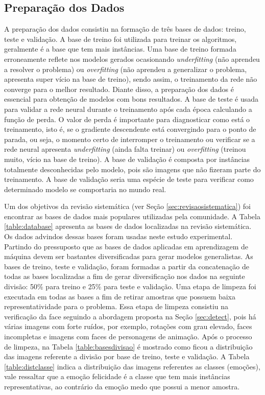 \subsection{Preparação dos Dados}\label{prepdados}
A preparação dos dados consistiu na formação de três bases de dados: treino, teste e validação. A base de treino foi utilizada para treinar os algoritmos, geralmente é a base que tem mais instâncias. Uma base de treino formada erroneamente reflete nos modelos gerados ocasionando \textit{underfitting} (não aprendeu a resolver o problema) ou \textit{overfitting} (não aprendeu a generalizar o problema, apresenta super vício na base de treino), sendo assim, o treinamento da rede não converge para o melhor resultado. Diante disso, a preparação dos dados é essencial para obtenção de modelos com bons resultados. A base de teste é usada para validar a rede neural durante o treinamento após cada época calculando a função de perda. O valor de perda é importante para diagnosticar como está o treinamento, isto é, se o gradiente descendente está convergindo para o ponto de parada, ou seja, o momento certo de interromper o treinamento ou verificar se a rede neural apresenta \textit{underfitting} (ainda falta treinar) ou \textit{overfitting} (treinou muito, vício na base de treino). A base de validação é composta por instâncias totalmente desconhecidas pelo modelo, pois são imagens que não fizeram parte do treinamento. A base de validação seria uma espécie de teste para verificar como determinado modelo se comportaria no mundo real.  

Um dos objetivos da revisão sistemática (ver Seção \ref{sec:revisaosistematica}) foi encontrar as bases de dados mais populares utilizadas pela comunidade. A Tabela \ref{table:database} apresenta as bases de dados localizadas na revisão sistemática. Os dados advindos dessas bases foram usadas neste estudo experimental. Partindo do pressuposto que as bases de dados aplicadas em aprendizagem de máquina devem ser bastantes diversificadas para gerar modelos generalistas. As bases de treino, teste e validação, foram formadas a partir da concatenação de todas as bases localizadas a fim de gerar diversificação nos dados na seguinte divisão: 50\% para treino e 25\% para teste e validação. Uma etapa de limpeza foi executada em todas as bases a fim de retirar amostras que possuem baixa representatividade para o problema. Essa etapa de limpeza consistiu na verificação da face seguindo a abordagem proposta na Seção \ref{sec:detect}, pois há várias imagens com forte ruídos, por exemplo, rotações com grau elevado, faces incompletas e imagens com faces de personagens de animação. Após o processo de limpeza, na Tabela \ref{table:basesdivisao} é mostrado como ficou a distribuição das imagens referente a divisão por base de treino, teste e validação. A Tabela \ref{table:distclasse} indica a distribuição das imagens referentes as classes (emoções), vale ressaltar que a emoção felicidade é a classe que tem mais instâncias representativas, ao contrário da emoção medo que possui a menor amostra.


